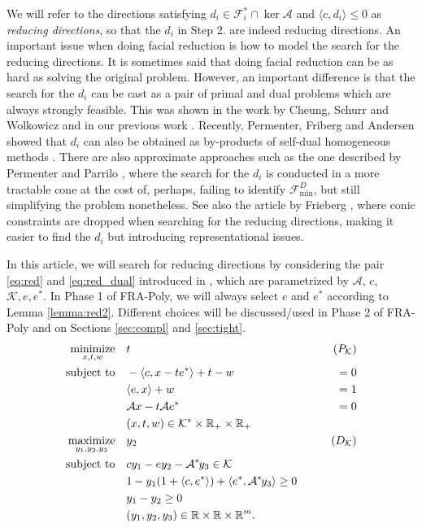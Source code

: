 \documentclass{article}
\newcommand{\inProd}[2]{\langle #1 , #2 \rangle }
\newcommand{\minFaceD}{ {\mathcal{F}_{\min}^D}}
\newcommand{\stdMap}{ {\mathcal{A}}}
\newcommand{\stdCone}{ {\mathcal{K}}}
\newcommand{\stdFace}{ \mathcal{F}}
\newcommand{\stdInt}{ {e}}
\renewcommand{\Re}{\mathbb{R}}
\newcommand{\T}{\ast\hspace{-1pt}}
\begin{document}
We will refer to the directions satisfying $d_i \in \stdFace _i^* \cap \ker \stdMap$ and 
$\inProd{c}{d_i} \leq 0$ as \emph{reducing directions}, so that the $d_i$ in Step 2. are indeed reducing directions. An important issue when doing facial reduction is how to model the 
search for the reducing directions. It is sometimes said that doing facial 
reduction can be as hard as solving the original problem. However, an important 
difference is that the search for the $d _i$ can be cast as a pair of primal and 
dual problems which are always strongly feasible.
This was shown in the work by Cheung, Schurr and Wolkowicz \cite{csw13} and 
in our previous work \cite{lourenco_muramatsu_tsuchiya3}. 
Recently,
Permenter, Friberg and Andersen showed that $d_i$ can also be obtained as by-products 
of self-dual homogeneous methods \cite{PFA15}.
There are 
also approximate approaches such as the one described by Permenter and Parrilo \cite{PP14}, 
where the search for the $d_i$ is conducted in a more tractable cone at 
the cost of, perhaps, failing to identify $\minFaceD$, but still simplifying 
the problem nonetheless. See also the article by Frieberg \cite{Fr16}, where 
conic constraints are dropped when searching for the reducing directions, making it easier 
to find the $d_i$ but introducing  representational issues.

In this article, we will search for reducing directions by
considering the pair \eqref{eq:red} and \eqref{eq:red_dual} introduced in \cite{lourenco_muramatsu_tsuchiya3}, which 
are parametrized by $\stdMap$, $c$, $\stdCone, \stdInt, \stdInt^*$. In Phase 1 of FRA-Poly, we will always 
select $\stdInt$ and $\stdInt^*$ according to Lemma \ref{lemma:red2}. Different choices will be discussed/used 
in Phase 2 of FRA-Poly and on Sections \ref{sec:compl} and \ref{sec:tight}.
\begin{align}
\underset{x,t,w}{\mbox{minimize}} & \quad t & \tag{$P_\stdCone $}\label{eq:red}  \\ 
\mbox{subject to} & \quad -\inProd{c}{x  -t\stdInt^*} + t - w &= 0 \label{eq:red:1}\\
&\quad \inProd{\stdInt}{x} + w &= 1 \label{eq:red:2}\\
& \quad\stdMap x  -t\stdMap \stdInt^* & = 0 \label{eq:red:3}\\
&\quad (x,t,w) \in \stdCone ^* \times \Re_+ \times \Re_+ \nonumber\\
\underset{y_1,y_2,y_3}{\mbox{maximize}} &\quad  y_2 & \tag{$D_\stdCone $}\label{eq:red_dual}  \\ 
\mbox{subject to} & \quad cy_1 -\stdInt y_2 -\stdMap^\T y_3 \in \stdCone \label{eq:red_dual:1} \\
&\quad 1-y_1(1+\inProd{c}{\stdInt^*}) + \inProd{\stdInt^* }{\stdMap ^\T y_3}\geq 0 \label{eq:red_dual:2} \\
& \quad y_1-y_2 \geq 0 \label{eq:red_dual:3} \\
&\quad (y_1,y_2,y_3) \in \Re \times \Re \times \Re^m. \nonumber
\end{align}
\end{document}
